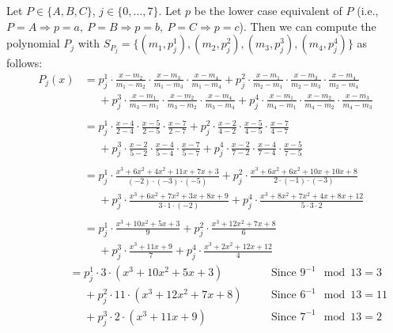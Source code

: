 \begin{enumerate}
    Let $P\in \{A,B,C\}$, $j\in \{0,\dots,7\}$. 
    Let $p$ be the lower case equivalent of $P$ (i.e., $P=A\Rightarrow p=a,\:P=B\Rightarrow p=b,\:P=C\Rightarrow p=c$).
    Then we can compute the polynomial $P_j$ with $S_{P_j}=\{(m_1,p_j^1), (m_2, p_j^2), (m_3, p_j^3), (m_4, p_j^4)\}$ as follows:
    \begin{align*}
        P_j(x) &= p_j^1\cdot\frac{x-m_2}{m_1-m_2}\cdot\frac{x-m_3}{m_1-m_3}\cdot\frac{x-m_4}{m_1-m_4} 
            + p_j^2\cdot \frac{x-m_1}{m_2-m_1}\cdot\frac{x-m_3}{m_2-m_3}\cdot\frac{x-m_4}{m_2-m_4}\\
            &\phantom{=} + p_j^3\cdot \frac{x-m_1}{m_3-m_1}\cdot\frac{x-m_2}{m_3-m_2}\cdot\frac{x-m_4}{m_3-m_4} 
            + p_j^4\cdot \frac{x-m_1}{m_4-m_1}\cdot\frac{x-m_2}{m_4-m_2}\cdot\frac{x-m_3}{m_4-m_3}\\
            &\\
            &=  p_j^1\cdot\frac{x-4}{2-4}\cdot\frac{x-5}{2-5}\cdot\frac{x-7}{2-7} 
            + p_j^2\cdot\frac{x-2}{4-2}\cdot\frac{x-5}{4-5}\cdot\frac{x-7}{4-7}\\
            &\phantom{=} + p_j^3\cdot\frac{x-2}{5-2}\cdot\frac{x-4}{5-4}\cdot\frac{x-7}{5-7} 
            + p_j^4\cdot\frac{x-2}{7-2}\cdot\frac{x-4}{7-4}\cdot\frac{x-5}{7-5}\\
            &\\
            &=p_j^1\cdot \frac{x^3+6x^2+4x^2+11x+7x+3}{(-2)\cdot (-3)\cdot (-5)} %
            +p_j^2\cdot \frac{x^3+6x^2+6x^2+10x+10x+8}{2\cdot (-1)\cdot (-3)}\\ %
            &\phantom{=} +p_j^3\cdot \frac{x^3+6x^2+7x^2+3x+8x+9}{3\cdot 1\cdot (-2)} %
            + p_j^4\cdot \frac{x^3+8x^2+7x^2+4x+8x+12}{5\cdot 3\cdot 2}\\ %
            &\\
            &=p_j^1\cdot \frac{x^3+10x^2+5x+3}{9}
            + p_j^2\cdot \frac{x^3+12x^2+7x+8}{6}\\
            &\phantom{=} +p_j^3\cdot \frac{x^3+11x+9}{7}
            +p_j^4\cdot \frac{x^3+2x^2+12x+12}{4}
    \end{align*}
    \begin{align*}
        \phantom{P_j(x)}&=p_j^1\cdot 3\cdot (x^3+10x^2+5x+3) &&\quad \text{Since } 9^{-1}\mod 13=3\\
            &\phantom{=} + p_j^2\cdot 11\cdot(x^3+12x^2+7x+8) &&\quad \text{Since } 6^{-1}\mod 13=11\\
            &\phantom{=} + p_j^3\cdot 2\cdot(x^3+11x+9) &&\quad \text{Since } 7^{-1}\mod 13=2\\

\end{align*}
\end{enumerate}
